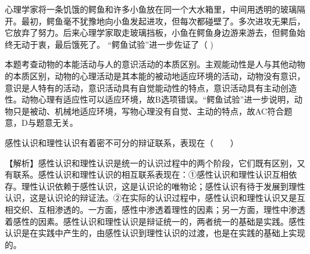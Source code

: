 \question 心理学家将一条饥饿的鳄鱼和许多小鱼放在同一个大水箱里，中间用透明的玻璃隔开。最初，鳄鱼毫不犹豫地向小鱼发起进攻，但每次都碰壁了。多次进攻无果后，它放弃了努力。后来心理学家取走玻璃挡板，小鱼在鳄鱼身边游来游去，但鳄鱼始终无动于衷，最后饿死了。
``鳄鱼试验''进一步佐证了（ )
\par{}
\begin{solution}本题考查动物的本能活动与人的意识活动的本质区别。主观能动性是人与其他动物的本质区别，动物的心理活动是其本能的被动地适应环境的活动，动物没有意识，意识是人特有的活动，意识活动具有自觉能动性的特点，意识活动具有主动创造性。动物心理有适应性可以适应环境，故B选项错误。``鳄鱼试验''进一步说明，动物只是被动、机械地适应环境，写物心理没有自觉、主动的特点，故AC符合题意，D与题意无关。
\end{solution}
\question 感性认识和理性认识有着密不可分的辩证联系，表现在（　　）
\par\fourch{\textcolor{red}{理性认识依赖于感性认识}}{\textcolor{red}{感性认识有待于发展和深化为理性认识}}{\textcolor{red}{感性认识和理性认识相互渗透、相互包含}}{\textcolor{red}{感性认识和理性认识在实践的基础上辩证统一}}
\begin{solution}【解析】感性认识和理性认识是统一的认识过程中的两个阶段，它们既有区别，又有联系。感性认识和理性认识的相互联系表现在：①感性认识和理性认识互相依存。理性认识依赖于感性认识，这是认识论的唯物论；感性认识有待于发展到理性认识，这是认识论的辩证法。②在实际的认识过程中，感性认识和理性认识又是互相交织、互相渗透的。一方面，感性中渗透着理性的因素；另一方面，理性中渗透着感性的因素。感性认识和理性认识是辩证统一的，两者统一的基础是实践。感性认识是在实践中产生的，由感性认识到理性认识的过渡，也是在实践的基础上实现的。
\end{solution}
